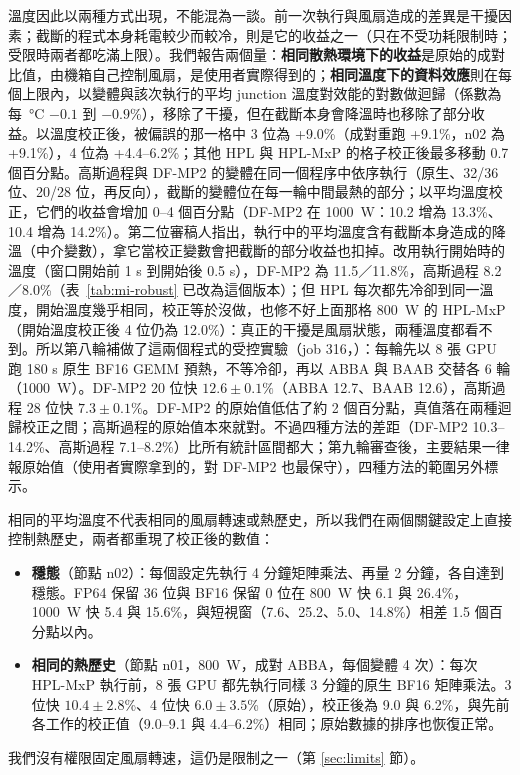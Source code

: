溫度因此以兩種方式出現，不能混為一談。前一次執行與風扇造成的差異是干擾因素；截斷的程式本身耗電較少而較冷，則是它的收益之一（只在不受功耗限制時；受限時兩者都吃滿上限）。我們報告兩個量：\textbf{相同散熱環境下的收益}是原始的成對比值，由機箱自己控制風扇，是使用者實際得到的；\textbf{相同溫度下的資料效應}則在每個上限內，以變體與該次執行的平均 junction 溫度對效能的對數做迴歸（係數為每 \,°C $-0.1$ 到 $-0.9$\%），移除了干擾，但在截斷本身會降溫時也移除了部分收益。以溫度校正後，被偏誤的那一格中 3 位為 +9.0\%（成對重跑 +9.1\%，n02 為 +9.1\%），4 位為 +4.4–6.2\%；其他 HPL 與 HPL-MxP 的格子校正後最多移動 0.7 個百分點。高斯過程與 DF-MP2 的變體在同一個程序中依序執行（原生、32/36 位、20/28 位，再反向），截斷的變體位在每一輪中間最熱的部分；以平均溫度校正，它們的收益會增加 0–4 個百分點（DF-MP2 在 1000~W：10.2 增為 13.3\%、10.4 增為 14.2\%）。第二位審稿人指出，執行中的平均溫度含有截斷本身造成的降溫（中介變數），拿它當校正變數會把截斷的部分收益也扣掉。改用執行開始時的溫度（窗口開始前 1 s 到開始後 0.5 s），DF-MP2 為 11.5／11.8\%，高斯過程 8.2／8.0\%（表~\ref{tab:mi-robust} 已改為這個版本）；但 HPL 每次都先冷卻到同一溫度，開始溫度幾乎相同，校正等於沒做，也修不好上面那格 800~W 的 HPL-MxP（開始溫度校正後 4 位仍為 12.0\%）：真正的干擾是風扇狀態，兩種溫度都看不到。所以第八輪補做了這兩個程式的受控實驗（job 316，）：每輪先以 8 張 GPU 跑 180 s 原生 BF16 GEMM 預熱，不等冷卻，再以 ABBA 與 BAAB 交替各 6 輪（1000~W）。DF-MP2 20 位快 $12.6\pm0.1\%$（ABBA 12.7、BAAB 12.6），高斯過程 28 位快 $7.3\pm0.1\%$。DF-MP2 的原始值低估了約 2 個百分點，真值落在兩種迴歸校正之間；高斯過程的原始值本來就對。不過四種方法的差距（DF-MP2 10.3–14.2\%、高斯過程 7.1–8.2\%）比所有統計區間都大；第九輪審查後，主要結果一律報原始值（使用者實際拿到的，對 DF-MP2 也最保守），四種方法的範圍另外標示。

相同的平均溫度不代表相同的風扇轉速或熱歷史，所以我們在兩個關鍵設定上直接控制熱歷史，兩者都重現了校正後的數值：
\begin{itemize}
  \item \textbf{穩態}（節點 n02）：每個設定先執行 4 分鐘矩陣乘法、再量 2 分鐘，各自達到穩態。FP64 保留 36 位與 BF16 保留 0 位在 800~W 快 6.1 與 26.4\%，1000~W 快 5.4 與 15.6\%，與短視窗（7.6、25.2、5.0、14.8\%）相差 1.5 個百分點以內。
  \item \textbf{相同的熱歷史}（節點 n01，800~W，成對 ABBA，每個變體 4 次）：每次 HPL-MxP 執行前，8 張 GPU 都先執行同樣 3 分鐘的原生 BF16 矩陣乘法。3 位快 $10.4\pm2.8$\%、4 位快 $6.0\pm3.5$\%（原始），校正後為 9.0 與 6.2\%，與先前各工作的校正值（9.0–9.1 與 4.4–6.2\%）相同；原始數據的排序也恢復正常。
\end{itemize}
我們沒有權限固定風扇轉速，這仍是限制之一（第 \ref{sec:limits} 節）。

